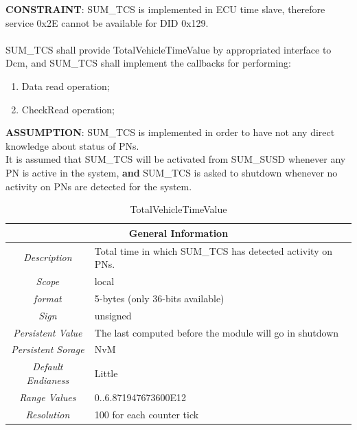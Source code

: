 \textbf{CONSTRAINT}: SUM\_TCS is implemented in ECU time slave, therefore service 0x2E cannot be available for DID 0x129.
\\
\\
SUM\_TCS shall provide TotalVehicleTimeValue  by appropriated interface to Dcm, and SUM\_TCS shall implement the callbacks for performing:

\begin{enumerate}
	\item Data read operation;
	\item CheckRead operation;
\end{enumerate}

\textbf{ASSUMPTION}: SUM\_TCS is implemented in order to have not any direct knowledge about status of PNs.
\\
It is assumed that SUM\_TCS will be activated from SUM\_SUSD whenever any PN is active in the system, \textbf{and} SUM\_TCS is asked to shutdown whenever no activity on PNs are detected for the system.

\begin{table}[h!]
	\centering
	\begin{tabular}{|c|l|}
		\hline
		\multicolumn{2}{|c|}{\cellcolor{ETASlightgray}\textbf{General Information}}\\
		\hline
		\cellcolor{ETASlightgray} \textit{Description} & Total time in which SUM\_TCS has detected activity on PNs.\\
		\hline
		\cellcolor{ETASlightgray} \textit{Scope} & local\\
		\hline
		\cellcolor{ETASlightgray} \textit{format} & 5-bytes (only 36-bits available) \\
		\hline
		\cellcolor{ETASlightgray} \textit{Sign} & unsigned \\
		\hline
		\cellcolor{ETASlightgray} \textit{Persistent Value} & The last computed before the module will go in shutdown\\
		\hline
		\cellcolor{ETASlightgray} \textit{Persistent Sorage} & NvM \\
		\hline
		\cellcolor{ETASlightgray} \textit{Default Endianess} & Little \\
		\hline
		\cellcolor{ETASlightgray} \textit{Range Values} & 0..6.871947673600E12\\
		\hline
		\cellcolor{ETASlightgray} \textit{Resolution} & 100\code{ms} for each counter tick \\
		\hline
	\end{tabular}
	\caption{TotalVehicleTimeValue }
	\label{tab:TotalVehicleTimeValue }
\end{table}

